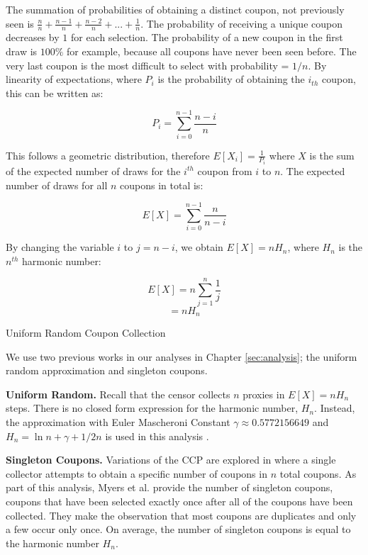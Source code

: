 The summation of probabilities of obtaining a distinct coupon, not previously seen is $\frac{n}{n} + \frac{n-1}{n} + \frac{n-2}{n} + ... + \frac{1}{n}$. The probability of receiving a unique coupon decreases by $1$ for each selection. The probability of a new coupon in the first draw is $100\%$ for example, because all coupons have never been seen before. The very last coupon is the most difficult to select with probability = $1/n$.
By linearity of expectations, where $P_i$ is the probability of obtaining the $i_{th}$ coupon, this can be written as:

$$P_i = \sum_{i=0}^{n-1}\frac{n-i}{n}$$

This follows a geometric distribution, therefore $E[X_i]=\frac{1}{P_i}$ where $X$ is the sum of the expected number of draws for the $i^{th}$ coupon from $i$ to $n$.
The expected number of draws for all $n$ coupons in total is:

$$E[X] = \sum_{i=0}^{n-1}\frac{n}{n-i}$$

By changing the variable $i$ to $j=n-i$, we obtain $E[X] = nH_n$, where $H_n$ is the $n^{th}$ harmonic number:

$$E[X] = n \sum_{j=1}^{n}\frac{1}{j}$$
$$= nH_n$$

\begin{algorithm}[t]
\DontPrintSemicolon
{}
\caption{Uniform Random Coupon Collection \label{uni}}
\end{algorithm}

We use two previous works in our analyses in Chapter \ref{sec:analysis}; the uniform random approximation and singleton coupons.

\textbf{Uniform Random.} Recall that the censor collects $n$ proxies in $E[X]= nH_n$ steps. There is no closed form expression for the harmonic number, $H_n$. Instead, the approximation with Euler Mascheroni Constant $\gamma \approx 0.5772156649$ and $H_n = \ln{n} + \gamma + 1/2n$ is used in this analysis \cite{flajolet1992birthday}.

\textbf{Singleton Coupons.} Variations of the CCP are explored in \cite{myers2006some} where a single collector attempts to obtain a specific number of coupons in $n$ total coupons. As part of this analysis, Myers et al. provide the number of singleton coupons, coupons that have been selected exactly once after all of the coupons have been collected. They make the observation that most coupons are duplicates and only a few occur only once. On average, the number of singleton coupons is equal to the harmonic number $H_n$. %

